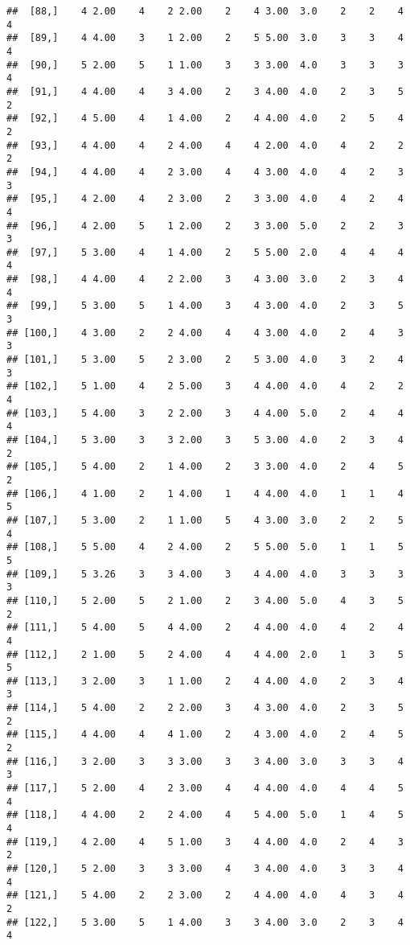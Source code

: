 \documentclass[]{article}
\begin{document}
\begin{verbatim}
##  [88,]    4 2.00    4    2 2.00    2    4 3.00  3.0    2    2    4    4
##  [89,]    4 4.00    3    1 2.00    2    5 5.00  3.0    3    3    4    4
##  [90,]    5 2.00    5    1 1.00    3    3 3.00  4.0    3    3    3    4
##  [91,]    4 4.00    4    3 4.00    2    3 4.00  4.0    2    3    5    2
##  [92,]    4 5.00    4    1 4.00    2    4 4.00  4.0    2    5    4    2
##  [93,]    4 4.00    4    2 4.00    4    4 2.00  4.0    4    2    2    2
##  [94,]    4 4.00    4    2 3.00    4    4 3.00  4.0    4    2    3    3
##  [95,]    4 2.00    4    2 3.00    2    3 3.00  4.0    4    2    4    4
##  [96,]    4 2.00    5    1 2.00    2    3 3.00  5.0    2    2    3    3
##  [97,]    5 3.00    4    1 4.00    2    5 5.00  2.0    4    4    4    4
##  [98,]    4 4.00    4    2 2.00    3    4 3.00  3.0    2    3    4    4
##  [99,]    5 3.00    5    1 4.00    3    4 3.00  4.0    2    3    5    3
## [100,]    4 3.00    2    2 4.00    4    4 3.00  4.0    2    4    3    3
## [101,]    5 3.00    5    2 3.00    2    5 3.00  4.0    3    2    4    3
## [102,]    5 1.00    4    2 5.00    3    4 4.00  4.0    4    2    2    4
## [103,]    5 4.00    3    2 2.00    3    4 4.00  5.0    2    4    4    4
## [104,]    5 3.00    3    3 2.00    3    5 3.00  4.0    2    3    4    2
## [105,]    5 4.00    2    1 4.00    2    3 3.00  4.0    2    4    5    2
## [106,]    4 1.00    2    1 4.00    1    4 4.00  4.0    1    1    4    5
## [107,]    5 3.00    2    1 1.00    5    4 3.00  3.0    2    2    5    4
## [108,]    5 5.00    4    2 4.00    2    5 5.00  5.0    1    1    5    5
## [109,]    5 3.26    3    3 4.00    3    4 4.00  4.0    3    3    3    3
## [110,]    5 2.00    5    2 1.00    2    3 4.00  5.0    4    3    5    2
## [111,]    5 4.00    5    4 4.00    2    4 4.00  4.0    4    2    4    4
## [112,]    2 1.00    5    2 4.00    4    4 4.00  2.0    1    3    5    5
## [113,]    3 2.00    3    1 1.00    2    4 4.00  4.0    2    3    4    3
## [114,]    5 4.00    2    2 2.00    3    4 3.00  4.0    2    3    5    2
## [115,]    4 4.00    4    4 1.00    2    4 3.00  4.0    2    4    5    2
## [116,]    3 2.00    3    3 3.00    3    3 4.00  3.0    3    3    4    3
## [117,]    5 2.00    4    2 3.00    4    4 4.00  4.0    4    4    5    4
## [118,]    4 4.00    2    2 4.00    4    5 4.00  5.0    1    4    5    4
## [119,]    4 2.00    4    5 1.00    3    4 4.00  4.0    2    4    3    2
## [120,]    5 2.00    3    3 3.00    4    3 4.00  4.0    3    3    4    4
## [121,]    5 4.00    2    2 3.00    2    4 4.00  4.0    4    3    4    2
## [122,]    5 3.00    5    1 4.00    3    3 4.00  3.0    2    3    4    4

\end{verbatim}
\end{document}
